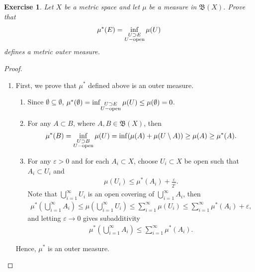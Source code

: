 \documentclass[11pt]{book}
\newtheorem{exercise}{Exercise}[chapter]
\theoremstyle{definition}
\numberwithin{equation}{chapter}
\def\BB{\mathfrak{B}}
\begin{document}
\begin{exercise}
Let $X$ be a metric space and let $\mu$ be a measure in $\BB(X)$. Prove that
$$
\mu^*(E) =
\inf_{\substack{U\supset E \\ U - {\rm open}}}\mu(U)
$$
defines a metric outer measure.
\end{exercise}
\begin{proof}
~\begin{enumerate}[label=(\alph*)]
    \item First, we prove that $\mu^*$ defined above is an outer measure.
    \begin{enumerate}[label=\arabic*)]
        \item Since $\emptyset \subseteq \emptyset$, $\mu^*(\emptyset) = \inf_{\substack{U\supset E \\ U - {\rm open}}}\mu(U) \leq \mu(\emptyset) = 0$.
        
        \item For any $A \subset B$, where $A, B \in \mathfrak{B}(X)$, then
        \begin{align*}
            \mu^*(B) = \inf_{\substack{U\supset B \\ U - {\rm open}}}\mu(U) = \inf (\mu(A) + \mu(U \setminus A)) \geq \mu(A) \geq \mu^*(A).
        \end{align*}
        
        \item For any $\varepsilon > 0$ and for each $A_i \subset X$, choose $U_i \subset X$ be open such that $A_i \subset U_i$ and
        \begin{align*}
            \mu(U_i) \leq \mu^*(A_i) + \frac{\varepsilon}{2^i}.
        \end{align*}
        Note that $\bigcup^\infty_{i=1} U_i$ is an open covering of $\bigcup^\infty_{i=1} A_i$, then 
        \begin{align*}
            \mu^*\left(\bigcup^\infty_{i=1} A_i\right) \leq \mu \left( \bigcup^\infty_{i=1} U_i\right) \leq \sum^\infty_{i=1} \mu(U_i) \leq \sum^\infty_{i=1} \mu^*(A_i) + \varepsilon,
        \end{align*}
        and letting $\varepsilon \to 0$ gives subadditivity
        \begin{align*}
            \mu^*\left(\bigcup^\infty_{i=1} A_i\right) \leq \sum^\infty_{i=1} \mu^*(A_i).
        \end{align*}
    \end{enumerate}
    Hence, $\mu^*$ is an outer measure.
    

\end{enumerate}
\end{proof}
\end{document}
